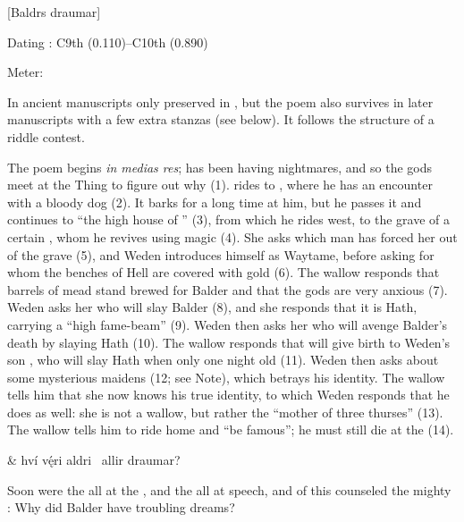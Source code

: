 [Baldrs draumar]

\begin{flushright}%
Dating \parencite{Sapp2022}: C9th (0.110)–C10th (0.890)

Meter: \Fornyrdislag%
\end{flushright}

In ancient manuscripts only preserved in \AM, but the poem also survives in later manuscripts with a few extra stanzas (see below). It follows the structure of a riddle contest.

The poem begins \emph{in medias res};  has been having nightmares, and so the gods meet at the Thing to figure out why (1).  rides to , where he has an encounter with a bloody dog (2). It barks for a long time at him, but he passes it and continues to “the high house of ” (3), from which he rides west, to the grave of a certain , whom he revives using magic (4). She asks which man has forced her out of the grave (5), and Weden introduces himself as Waytame, before asking for whom the benches of Hell are covered with gold (6). The wallow responds that barrels of mead stand brewed for Balder and that the gods are very anxious (7). Weden asks her who will slay Balder (8), and she responds that it is Hath, carrying a “high fame-beam” (9). Weden then asks her who will avenge Balder’s death by slaying Hath (10). The wallow responds that  will give birth to Weden’s son , who will slay Hath when only one night old (11). Weden then asks about some mysterious maidens (12; see Note), which betrays his identity. The wallow tells him that she now knows his true identity, to which Weden responds that he does as well: she is not a wallow, but rather the “mother of three thurses” (13). The wallow tells him to ride home and “be famous”; he must still die at the  (14).

\sectionline

\bvg
\bva{} &
hví vę́ri aldri \hld\ allir draumar?\eva

\bvb Soon were the  all at the , and the  all at speech, and of this counseled the mighty : Why did Balder have troubling dreams?\evb
\evg


